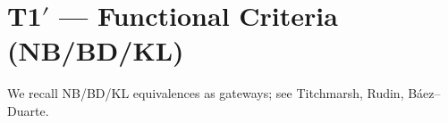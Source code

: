 \section{T1$′$ --- Functional Criteria (NB/BD/KL)}
We recall NB/BD/KL equivalences as gateways; see Titchmarsh, Rudin, B\'aez--Duarte.
